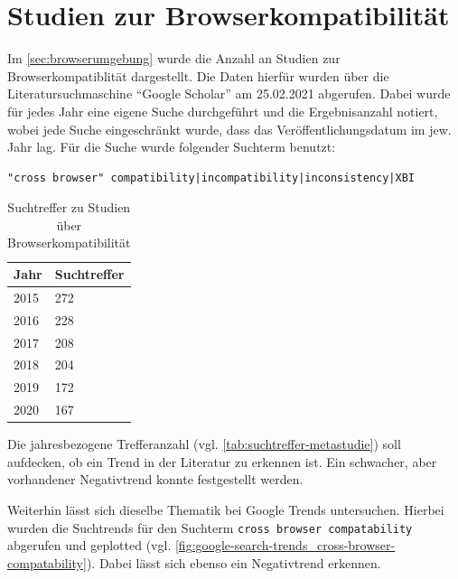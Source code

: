 \section{Studien zur Browserkompatibilität}
\label{sec:studien-zur-browser-kompatibilitaet}

Im \autoref{sec:browserumgebung} wurde die Anzahl an Studien zur Browserkompatiblität dargestellt. Die Daten hierfür wurden über die Literatursuchmaschine \enquote{Google Scholar} am 25.02.2021 abgerufen. Dabei wurde für jedes Jahr eine eigene Suche durchgeführt und die Ergebnisanzahl notiert, wobei jede Suche eingeschränkt wurde, dass das Veröffentlichungsdatum im jew. Jahr lag. Für die Suche wurde folgender Suchterm benutzt:
\begin{verbatim}
"cross browser" compatibility|incompatibility|inconsistency|XBI
\end{verbatim}

\begin{table}
\centering
\vspace{-\baselineskip}
\begin{tabular}{|l|l|}
  \hline
  Jahr & Suchtreffer \\
  \hline
  2015 & 272 \\
  \hline
  2016 & 228 \\
  \hline
  2017 & 208 \\
  \hline
  2018 & 204 \\
  \hline
  2019 & 172 \\
  \hline
  2020 & 167 \\
  \hline
\end{tabular}
\caption{Suchtreffer zu Studien über Browserkompatibilität}
	\label{tab:suchtreffer-metastudie}
\end{table}

\def\lc{\left\lceil}   
\def\rc{\right\rceil}

Die jahresbezogene Trefferanzahl (vgl. \autoref{tab:suchtreffer-metastudie}) soll aufdecken, ob ein Trend in der Literatur zu erkennen ist. Ein schwacher, aber vorhandener Negativtrend konnte festgestellt werden.

Weiterhin lässt sich dieselbe Thematik bei Google Trends \cite{GoogleTrendsCrossBrowserCompatibility} untersuchen. Hierbei wurden die Suchtrends für den Suchterm \texttt{cross browser compatability} abgerufen und geplotted (vgl. \autoref{fig:google-search-trends_cross-browser-compatability}). Dabei lässt sich ebenso ein Negativtrend erkennen.

